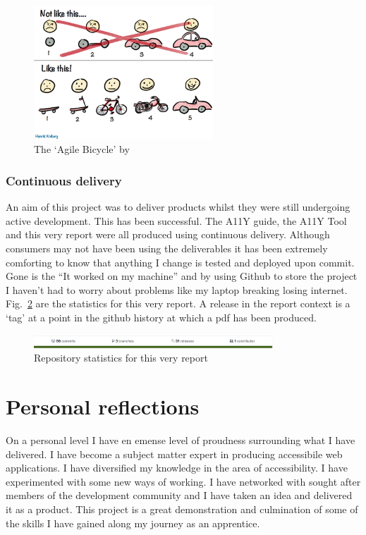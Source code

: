 \begin{figure}[H]
\centering
\includegraphics[width=0.6\textwidth]{figures/agile_bicycle}
\captionsetup{justification=centering}
\caption{The `Agile Bicycle' by \citep{bicycle}
\label{fig:agile_bicycle}}
\end{figure}

\subsubsection{Continuous delivery}
An aim of this project was to deliver products whilst they were still
undergoing active development. This has been successful. The A11Y guide, the
A11Y Tool and this very report were all produced using continuous delivery.
Although consumers may not have been using the deliverables it has been
extremely comforting to know that anything I change is tested and deployed
upon commit. Gone is the ``It worked on my machine'' and by using Github to
store the project I haven't had to worry about problems like my laptop
breaking losing internet. Fig.~\ref{fig:ghub} are the statistics for this
very report. A release in the report context is a `tag' at a point in the
github history at which a pdf has been produced.

\begin{figure}[H]
\centering
\includegraphics[width=0.8\textwidth]{figures/ghub}
\captionsetup{justification=centering}
\caption{Repository statistics for this very report
\label{fig:ghub}}
\end{figure}

\section{Personal reflections}
On a personal level I have en emense level of proudness surrounding what I
have delivered. I have become a subject matter expert in producing
accessibile web applications. I have diversified my knowledge in the area of
accessibility. I have experimented with some new ways of working. I have
networked with sought after members of the development community and I
have taken an idea and delivered it as a product. This project is a great
demonstration and culmination of some of the skills I have gained along my
journey as an apprentice.

